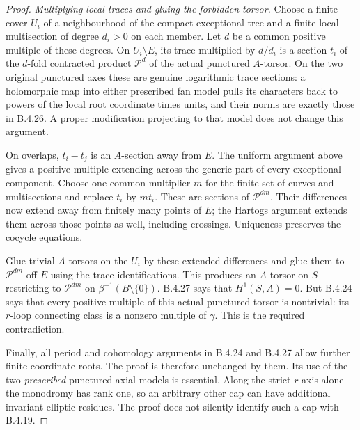 \begin{proof}
\emph{Multiplying local traces and gluing the forbidden torsor.}
Choose a finite cover $U_i$ of a
neighbourhood of the compact exceptional
tree and a finite local multisection of
degree $d_i>0$ on each member. Let $d$ be
a common positive multiple of these degrees.
On $U_i\setminus E$, its trace multiplied
by $d/d_i$ is a section $t_i$ of the
$d$-fold contracted product $\mathcal P^d$
of the actual punctured $A$-torsor.
On the two original punctured axes these
are genuine logarithmic trace sections:
a holomorphic map into either prescribed
fan model pulls its characters back to
powers of the local root coordinate times
units, and their norms are exactly those
in B.4.26. A proper modification projecting
to that model does not change this argument.

On overlaps, $t_i-t_j$ is an $A$-section
away from $E$. The uniform argument above
gives a positive multiple extending across
the generic part of every exceptional
component. Choose one common multiplier
$m$ for the finite set of curves and
multisections and replace $t_i$ by $mt_i$.
These are sections of $\mathcal P^{dm}$.
Their differences now extend away from
finitely many points of $E$; the Hartogs
argument extends them across those points
as well, including crossings. Uniqueness
preserves the cocycle equations.

Glue trivial $A$-torsors on the $U_i$ by
these extended differences and glue them
to $\mathcal P^{dm}$ off $E$ using the
trace identifications. This produces an
$A$-torsor on $S$ restricting to
$\mathcal P^{dm}$ on
$\beta^{-1}(B\setminus\{0\})$.
B.4.27 says that $H^1(S,A)=0$.
But B.4.24 says that every positive
multiple of this actual punctured torsor
is nontrivial: its $r$-loop connecting
class is a nonzero multiple of $\gamma$.
This is the required contradiction.

Finally, all period and cohomology arguments
in B.4.24 and B.4.27 allow further finite
coordinate roots. The proof is therefore
unchanged by them. Its use of the two
\emph{prescribed} punctured axial models
is essential. Along the strict $r$ axis
alone the monodromy has rank one, so an
arbitrary other cap can have additional
invariant elliptic residues. The proof
does not silently identify such a cap
with B.4.19.
\end{proof}
